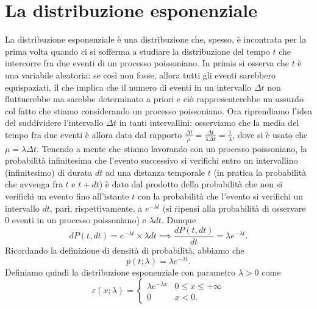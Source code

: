 \documentclass{report}
\begin{document}
\section{La distribuzione esponenziale}
La distribuzione esponenziale è una distribuzione che, spesso, è incontrata per la prima volta quando ci si sofferma a studiare la distribuzione del tempo $t$ che intercorre fra due eventi di un processo poissoniano. In primis si osserva che $t$ è una variabile aleatoria: se così non fosse, allora tutti gli eventi sarebbero equispaziati, il che implica che il numero di eventi in un intervallo $\Delta t$ non fluttuerebbe ma sarebbe determinato a priori e ciò rappresenterebbe un assurdo col fatto che stiamo considerando un processo poissoniano. Ora riprendiamo l'idea del suddividere l'intervallo $\Delta t$ in tanti intervallini: osserviamo che la media del tempo fra due eventi è allora data dal rapporto $\frac{\Delta t}{\mu} = \frac{\Delta t}{\lambda \Delta t} = \frac{1}{\lambda}$, dove si è usato che $\mu = \lambda \Delta t$. Tenendo a mente che stiamo lavorando con un processo poissoniano, la probabilità infinitesima che l'evento successivo si verifichi entro un intervallino (infinitesimo) di durata $dt$ ad una distanza temporale $t$ (in pratica la probabilità che avvenga fra $t$ e $t + dt$) è dato dal prodotto della probabilità che non si verifichi un evento fino all'istante $t$ con la probabilità che l'evento si verifichi un intervallo $dt$, pari, rispettivamente, a $e^{-\lambda t}$ (si ripensi alla probabilità di osservare $0$ eventi in un processo poissoniano) e $\lambda dt$. Dunque
$$
	dP(t, dt) = e^{-\lambda t} \times \lambda dt \implies \frac{dP(t, dt)}{dt} = \lambda e^{-\lambda t}.
$$
Ricordando la definizione di densità di probabilità, abbiamo che
$$
	p(t; \lambda) = \lambda e^{- \lambda t}.
$$
Definiamo quindi la distribuzione esponenziale con parametro $\lambda > 0$ come
$$
\varepsilon(x; \lambda) = \begin{cases}
	\lambda e^{-\lambda x} & 0 \leq x \leq +\infty \\
	0 & x < 0.
\end{cases}
$$
\end{document}
